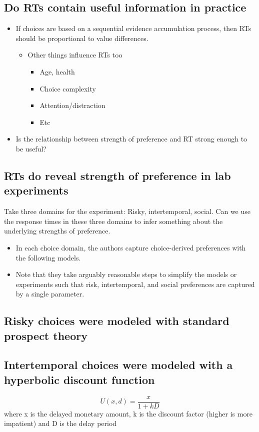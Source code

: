 \subsection{Do RTs contain useful information in practice}
\begin{itemize}
    \item If choices are based on a sequential evidence accumulation process, then RTs should be proportional to value differences.
    \begin{itemize}
        \item Other things influence RTs too
        \begin{itemize}
            \item Age, health
            \item Choice complexity
            \item Attention/distraction
            \item Etc
        \end{itemize}
    \end{itemize}
    \item Is the relationship between strength of preference and RT strong enough to be useful?
\end{itemize}
\subsection{RTs do reveal strength of preference in lab experiments}
Take three domains for the experiment: Risky, intertemporal, social. Can we use the response times in these three domains to infer something about the underlying strengths of preference.
\begin{itemize}
    \item In each choice domain, the authors capture choice-derived preferences with the following models.
    \item Note that they take arguably reasonable steps to simplify the models or experiments such that risk, intertemporal, and social preferences are captured by a single parameter.
\end{itemize}

\subsection{Risky choices were modeled with standard prospect theory}

\subsection{Intertemporal choices were modeled with a hyperbolic discount function}
\[U(x, d) = \frac{x}{1 + kD}\]
where x is the delayed monetary amount, k is the discount factor (higher is more impatient) and D is the delay period
